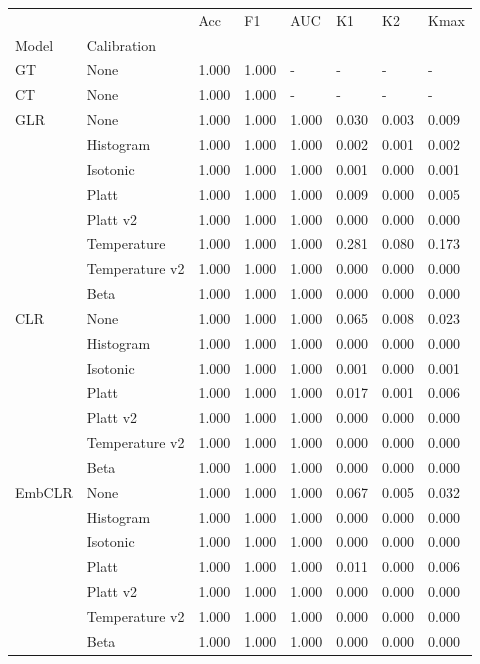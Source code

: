 \begin{tabular}{llllllll}
\toprule
 &  & Acc & F1 & AUC & K1 & K2 & Kmax \\
Model & Calibration &  &  &  &  &  &  \\
\midrule
GT & None & 1.000 & 1.000 & - & - & - & - \\
\cline{1-8}
CT & None & 1.000 & 1.000 & - & - & - & - \\
\cline{1-8}
\multirow[t]{8}{*}{GLR} & None & 1.000 & 1.000 & 1.000 & 0.030 & 0.003 & 0.009 \\
 & Histogram & 1.000 & 1.000 & 1.000 & 0.002 & 0.001 & 0.002 \\
 & Isotonic & 1.000 & 1.000 & 1.000 & 0.001 & 0.000 & 0.001 \\
 & Platt & 1.000 & 1.000 & 1.000 & 0.009 & 0.000 & 0.005 \\
 & Platt v2 & 1.000 & 1.000 & 1.000 & 0.000 & 0.000 & 0.000 \\
 & Temperature & 1.000 & 1.000 & 1.000 & 0.281 & 0.080 & 0.173 \\
 & Temperature v2 & 1.000 & 1.000 & 1.000 & 0.000 & 0.000 & 0.000 \\
 & Beta & 1.000 & 1.000 & 1.000 & 0.000 & 0.000 & 0.000 \\
\cline{1-8}
\multirow[t]{7}{*}{CLR} & None & 1.000 & 1.000 & 1.000 & 0.065 & 0.008 & 0.023 \\
 & Histogram & 1.000 & 1.000 & 1.000 & 0.000 & 0.000 & 0.000 \\
 & Isotonic & 1.000 & 1.000 & 1.000 & 0.001 & 0.000 & 0.001 \\
 & Platt & 1.000 & 1.000 & 1.000 & 0.017 & 0.001 & 0.006 \\
 & Platt v2 & 1.000 & 1.000 & 1.000 & 0.000 & 0.000 & 0.000 \\
 & Temperature v2 & 1.000 & 1.000 & 1.000 & 0.000 & 0.000 & 0.000 \\
 & Beta & 1.000 & 1.000 & 1.000 & 0.000 & 0.000 & 0.000 \\
\cline{1-8}
\multirow[t]{7}{*}{EmbCLR} & None & 1.000 & 1.000 & 1.000 & 0.067 & 0.005 & 0.032 \\
 & Histogram & 1.000 & 1.000 & 1.000 & 0.000 & 0.000 & 0.000 \\
 & Isotonic & 1.000 & 1.000 & 1.000 & 0.000 & 0.000 & 0.000 \\
 & Platt & 1.000 & 1.000 & 1.000 & 0.011 & 0.000 & 0.006 \\
 & Platt v2 & 1.000 & 1.000 & 1.000 & 0.000 & 0.000 & 0.000 \\
 & Temperature v2 & 1.000 & 1.000 & 1.000 & 0.000 & 0.000 & 0.000 \\
 & Beta & 1.000 & 1.000 & 1.000 & 0.000 & 0.000 & 0.000 \\
\cline{1-8}
\bottomrule
\end{tabular}
